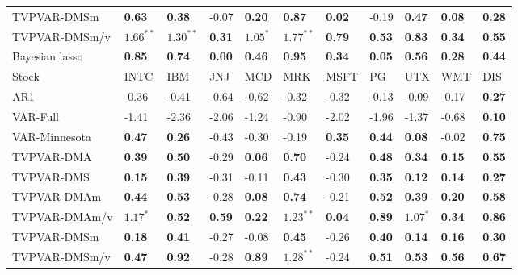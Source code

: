 \begin{table}[h!]
{\begin{center}
\begin{tabularx}{1\textwidth}{@{}X@{\hspace{0.15cm}}l@{\hspace{0.15cm}}l@{\hspace{0.15cm}}l@{\hspace{0.15cm}}l@{\hspace{0.15cm}}l@{\hspace{0.15cm}}l@{\hspace{0.15cm}}l@{\hspace{0.15cm}}l@{\hspace{0.15cm}}l@{\hspace{0.15cm}}l@{}}
 TVPVAR-DMSm  & \textbf{0.63}	 & \textbf{0.38}	 & -0.07	 & \textbf{0.20}	 & \textbf{0.87}	 & \textbf{0.02}	 & -0.19	 & \textbf{0.47}	 & \textbf{0.08}	 & \textbf{0.28}	\\
 TVPVAR-DMSm/v  & $\mathbf{1.66^{**}}$	 & $\mathbf{1.30^{**}}$	 & \textbf{0.31}	 & $\mathbf{1.05^{*}}$	 & $\mathbf{1.77^{**}}$	 & \textbf{0.79}	 & \textbf{0.53}	 & \textbf{0.83}	 & \textbf{0.34}	 & \textbf{0.55}	\\
\midrule
 Bayesian lasso  & \textbf{0.85}	 & \textbf{0.74}	 & \textbf{0.00}	 & \textbf{0.46}	 & \textbf{0.95}	 & \textbf{0.34}	 & \textbf{0.05}	 & \textbf{0.56}	 & \textbf{0.28}	 & \textbf{0.44}	\\
\midrule
\midrule
 Stock  & INTC	 & IBM	 & JNJ	 & MCD	 & MRK	 & MSFT	 & PG	 & UTX	 & WMT	 & DIS	\\
\midrule
 AR1  & -0.36	 & -0.41	 & -0.64	 & -0.62	 & -0.32	 & -0.32	 & -0.13	 & -0.09	 & -0.17	 & \textbf{0.27}	\\
 VAR-Full  & -1.41	 & -2.36	 & -2.06	 & -1.24	 & -0.90	 & -2.02	 & -1.96	 & -1.37	 & -0.68	 & \textbf{0.10}	\\
 VAR-Minnesota  & \textbf{0.47}	 & \textbf{0.26}	 & -0.43	 & -0.30	 & -0.19	 & \textbf{0.35}	 & \textbf{0.44}	 & \textbf{0.08}	 & -0.02	 & \textbf{0.75}	\\
\midrule
 TVPVAR-DMA  & \textbf{0.39}	 & \textbf{0.50}	 & -0.29	 & \textbf{0.06}	 & \textbf{0.70}	 & -0.24	 & \textbf{0.48}	 & \textbf{0.34}	 & \textbf{0.15}	 & \textbf{0.55}	\\
 TVPVAR-DMS  & \textbf{0.15}	 & \textbf{0.39}	 & -0.31	 & -0.11	 & \textbf{0.43}	 & -0.30	 & \textbf{0.35}	 & \textbf{0.12}	 & \textbf{0.14}	 & \textbf{0.27}	\\
\midrule
 TVPVAR-DMAm  & \textbf{0.44}	 & \textbf{0.53}	 & -0.28	 & \textbf{0.08}	 & \textbf{0.74}	 & -0.21	 & \textbf{0.52}	 & \textbf{0.39}	 & \textbf{0.20}	 & \textbf{0.58}	\\
 TVPVAR-DMAm/v  & $\mathbf{1.17^{*}}$	 & \textbf{0.52}	 & \textbf{0.59}	 & \textbf{0.22}	 & $\mathbf{1.23^{**}}$	 & \textbf{0.04}	 & \textbf{0.89}	 & $\mathbf{1.07^{*}}$	 & \textbf{0.34}	 & \textbf{0.86}	\\
 TVPVAR-DMSm  & \textbf{0.18}	 & \textbf{0.41}	 & -0.27	 & -0.08	 & \textbf{0.45}	 & -0.26	 & \textbf{0.40}	 & \textbf{0.14}	 & \textbf{0.16}	 & \textbf{0.30}	\\
 TVPVAR-DMSm/v  & \textbf{0.47}	 & \textbf{0.92}	 & -0.28	 & \textbf{0.89}	 & $\mathbf{1.28^{**}}$	 & -0.24	 & \textbf{0.51}	 & \textbf{0.53}	 & \textbf{0.56}	 & \textbf{0.67}	\\

\end{tabularx}
\end{center}}
\end{table}
